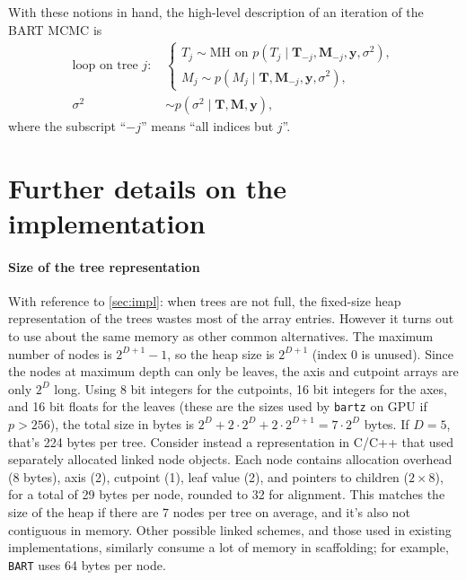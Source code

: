 \documentclass{article}
\begin{document}
With these notions in hand, the high-level description of an iteration of the BART MCMC is
%
\begin{align}
	\text{loop on tree $j$: } & \begin{cases}
		                            T_j \sim \text{MH on } p(T_j\mid\mathbf T_{-j},\mathbf M_{-j},\mathbf y,\sigma^2), \\
		                            M_j \sim p(M_j\mid\mathbf T,\mathbf M_{-j},\mathbf y,\sigma^2),
	                            \end{cases} \\
	\sigma^2                  & \sim p(\sigma^2\mid\mathbf T,\mathbf M,\mathbf y),
\end{align}
%
where the subscript ``$-j$'' means ``all indices but $j$''.

\section{Further details on the implementation}
\label{sec:impldetails}

\paragraph{Size of the tree representation}

With reference to \autoref{sec:impl}: when trees are not full, the fixed-size heap representation of the trees
wastes most of the array entries. However it turns out to use about the same
memory as other common alternatives. The maximum number of nodes is $2^{D+1} - 1$,
so the heap size is $2^{D+1}$ (index 0 is unused). Since the nodes at maximum depth
can only be leaves, the axis and cutpoint arrays are only $2^D$ long. Using
8 bit integers for the cutpoints, 16 bit integers for the axes, and 16 bit floats for the leaves (these are the sizes used by \texttt{bartz} on GPU if $p > 256$), the total size in bytes is $2^D +
	2\cdot2^D + 2\cdot 2^{D+1} = 7\cdot 2^D$ bytes. If $D=5$, that's 224 bytes per tree. Consider instead
a representation in C/C++ that used separately allocated linked node objects.
Each node contains allocation overhead (8 bytes), axis (2), cutpoint (1), leaf
value (2), and pointers to children ($2\times 8$), for a total of 29 bytes per
node, rounded to 32 for alignment. This matches the size of the heap if there
are 7 nodes per tree on average, and it's also not contiguous in memory. Other
possible linked schemes, and those used in existing implementations, similarly
consume a lot of memory in scaffolding; for example, \texttt{BART} uses 64 bytes
per node. %
\end{document}
